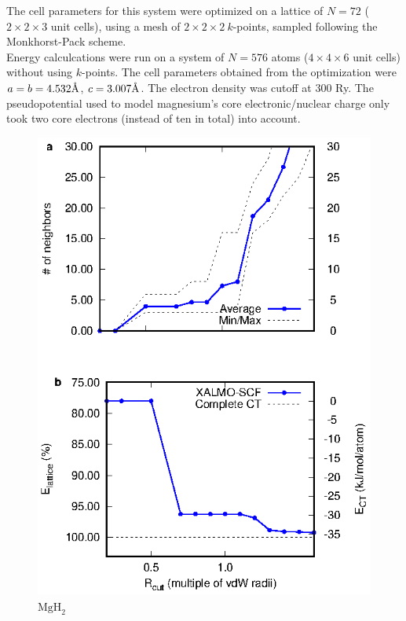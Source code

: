 \documentclass[aps,prb,twocolumn,amsmath,amssymb,superscriptaddress,longbibliography]{revtex4-1}
\newcommand{\angstrom}{\text{\normalfont\AA}}
\begin{document}
The cell parameters for this system were optimized on a lattice of $N = 72$ ($2\times 2\times 3$ unit cells), using a mesh of $2\times 2\times 2\: k$-points, sampled following the Monkhorst-Pack scheme\cite{kpts}.\\ 
Energy calculcations were run on a system of $N = 576$ atoms ($4\times 4\times 6$ unit cells) without using $k$-points. The cell parameters obtained from the optimization were $a = b = 4.532\angstrom$, $c = 3.007\angstrom$. The electron density was cutoff at 300 Ry. The pseudopotential used to model magnesium's core electronic/nuclear charge only took two core electrons (instead of ten in total) into account.
\\ 
\begin{figure}
\includegraphics[scale=1]{plots/MgH2_EvR}
\caption{$\text{MgH}_{2}$}
\end{figure}
\end{document}
